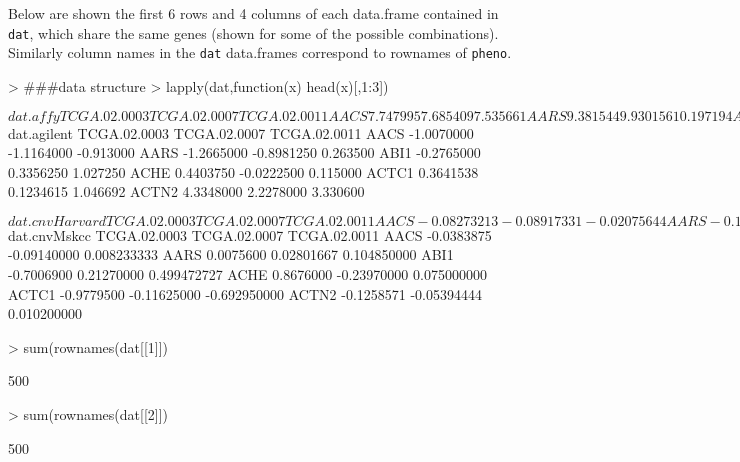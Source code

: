 \documentclass[11pt]{article}
\newcommand{\Robject}[1]{{\texttt{#1}}}
\begin{document}
Below are shown the first 6 rows and 4  columns of each data.frame contained in \texttt{dat},
which share the same genes (shown for some of the possible combinations).
Similarly column names in the \Robject{dat} data.frames correspond to rownames of \Robject{pheno}.

\begin{Schunk}
\begin{Sinput}
> ###data structure
> lapply(dat,function(x) head(x)[,1:3])
\end{Sinput}
\begin{Soutput}
$dat.affy
      TCGA.02.0003 TCGA.02.0007 TCGA.02.0011
AACS      7.747995     7.685409     7.535661
AARS      9.381544     9.930156    10.197194
ABI1      8.173255     8.962803     9.895811
ACHE      5.127197     4.547297     5.146552
ACTC1     6.612645     5.825879     8.067945
ACTN2     6.257383     5.330557     5.842319

$dat.agilent
      TCGA.02.0003 TCGA.02.0007 TCGA.02.0011
AACS    -1.0070000   -1.1164000    -0.913000
AARS    -1.2665000   -0.8981250     0.263500
ABI1    -0.2765000    0.3356250     1.027250
ACHE     0.4403750   -0.0222500     0.115000
ACTC1    0.3641538    0.1234615     1.046692
ACTN2    4.3348000    2.2278000     3.330600

$dat.cnvHarvard
      TCGA.02.0003 TCGA.02.0007 TCGA.02.0011
AACS   -0.08273213  -0.08917331  -0.02075644
AARS   -0.10233281  -0.20620608  -0.05157664
ABI1   -0.86886659  -0.01214599   0.59307754
ACHE    0.31560002  -1.00166150  -0.14519639
ACTC1  -1.17495078  -0.26698279  -0.95662761
ACTN2  -0.11319016  -0.09657971   0.02582138

$dat.cnvMskcc
      TCGA.02.0003 TCGA.02.0007 TCGA.02.0011
AACS    -0.0383875  -0.09140000  0.008233333
AARS     0.0075600   0.02801667  0.104850000
ABI1    -0.7006900   0.21270000  0.499472727
ACHE     0.8676000  -0.23970000  0.075000000
ACTC1   -0.9779500  -0.11625000 -0.692950000
ACTN2   -0.1258571  -0.05394444  0.010200000
\end{Soutput}
\begin{Sinput}
> sum(rownames(dat[[1]])%in%rownames(dat[[2]]))
\end{Sinput}
\begin{Soutput}
[1] 500
\end{Soutput}
\begin{Sinput}
> sum(rownames(dat[[2]])%in%rownames(dat[[3]]))
\end{Sinput}
\begin{Soutput}
[1] 500
\end{Soutput}
\end{Schunk}
\end{document}
